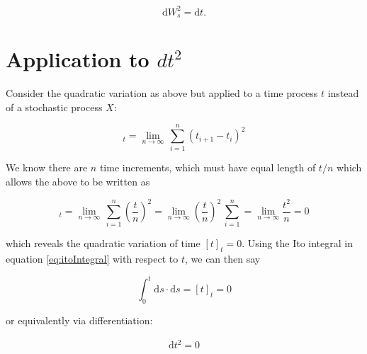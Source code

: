\documentclass[12pt]{article}
\begin{document}
\begin{equation}
	\mathrm{d}W_s^2 = \mathrm{d}t.
\end{equation}


\section{Application to $dt^2$}

Consider the quadratic variation as above but applied to a time process $t$ instead of a stochastic process $X$:

\begin{equation}
	[t]_t =\lim\limits_{n\to \infty}\,\sum_{i=1}^n\left(t_{i+1} - t_i\right)^2
\end{equation}

\noindent We know there are $n$ time increments, which must have equal length of $t/n$ which allows the above to be written as


\begin{equation}
	[t]_t =\lim\limits_{n\to \infty}\,\sum_{i=1}^n\left(\frac{t}{n}\right)^2=\lim\limits_{n\to \infty}\left(\frac{t}{n}\right)^2\,\sum_{i=1}^n=\lim\limits_{n\to \infty}\frac{t^2}{n}=0
\end{equation}

\noindent which reveals the quadratic variation of time $[t]_t=0$. Using the Ito integral in equation \ref{eq:itoIntegral} with respect to $t$, we can then say


\begin{equation}
	\int_{0}^{t}\mathrm{d}s\cdot\mathrm{d}s =[t]_t=0
\end{equation}

\noindent or equivalently via differentiation:

\begin{eqnarray}
	\mathrm{d}t^2=0
\end{eqnarray}
\end{document}
